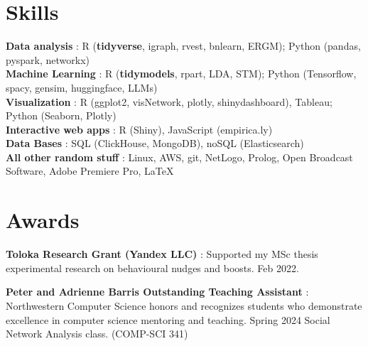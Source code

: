 \documentclass[letterpaper,11pt]{article}
\begin{document}
\section{Skills}
 \begin{itemize}[leftmargin=0in, label={}]
    \small{\item{
     \textbf{Data analysis} {: R (\textbf{tidyverse}, igraph, rvest, bnlearn, ERGM); Python (pandas, pyspark, networkx)} \vspace{2pt} \\
    \textbf{Machine Learning} {: R (\textbf{tidymodels}, rpart, LDA, STM); Python (Tensorflow, spacy, gensim, huggingface, LLMs)} \vspace{2pt} \\
    \textbf{Visualization} {: R (ggplot2, visNetwork, plotly, shinydashboard), Tableau;  Python (Seaborn, Plotly) } \vspace{2pt} \\
    \textbf{Interactive web apps} {: R (Shiny), JavaScript (empirica.ly)} \vspace{2pt} \\
    \textbf{Data Bases} {: SQL (ClickHouse, MongoDB), noSQL (Elasticsearch)} \vspace{2pt} \\
    \textbf{All other random stuff} {: Linux, AWS, git, NetLogo, Prolog, Open Broadcast Software, Adobe Premiere Pro, \LaTeX}
    }}
 \end{itemize}

\section{Awards}
 \begin{itemize}[leftmargin=0in, label={}]
    \small{\item{
     \textbf{Toloka Research Grant (Yandex LLC)} {: Supported my MSc thesis experimental research on behavioural nudges and boosts. Feb 2022.} \vspace{2pt} \\
    }}
    \small{\item{
     \textbf{Peter and Adrienne Barris Outstanding Teaching Assistant} {: Northwestern Computer Science honors and recognizes students who demonstrate excellence in computer science mentoring and teaching. Spring 2024 Social Network Analysis class. (COMP-SCI 341)} \vspace{2pt} \\
    }}
 \end{itemize}
\end{document}
